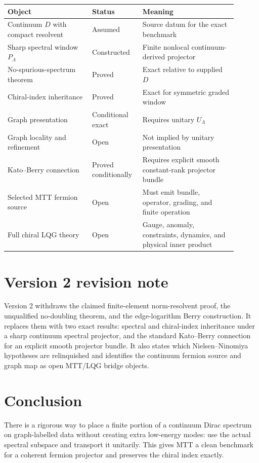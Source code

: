 \documentclass[11pt]{article}
\begin{document}
\begin{center}
\begin{tabular}{p{0.34\linewidth}p{0.18\linewidth}p{0.38\linewidth}}
\hline
Object & Status & Meaning\\
\hline
Continuum \(D\) with compact resolvent & Assumed & Source datum for the exact
benchmark\\
Sharp spectral window \(P_\Lambda\) & Constructed & Finite nonlocal
continuum-derived projector\\
No-spurious-spectrum theorem & Proved & Exact relative to supplied \(D\)\\
Chiral-index inheritance & Proved & Exact for symmetric graded window\\
Graph presentation & Conditional exact & Requires unitary
\(U_\Lambda\)\\
Graph locality and refinement & Open & Not implied by unitary presentation\\
Kato--Berry connection & Proved conditionally & Requires explicit smooth
constant-rank projector bundle\\
Selected MTT fermion source & Open & Must emit bundle, operator, grading, and
finite operation\\
Full chiral LQG theory & Open & Gauge, anomaly, constraints, dynamics, and
physical inner product\\
\hline
\end{tabular}
\end{center}

\section{Version 2 revision note}

Version 2 withdraws the claimed finite-element norm-resolvent proof, the
unqualified no-doubling theorem, and the edge-logarithm Berry construction.
It replaces them with two exact results: spectral and chiral-index
inheritance under a sharp continuum spectral projector, and the standard
Kato--Berry connection for an explicit smooth projector bundle. It also
states which Nielsen--Ninomiya hypotheses are relinquished and identifies the
continuum fermion source and graph map as open MTT/LQG bridge objects.

\section{Conclusion}

There is a rigorous way to place a finite portion of a continuum Dirac
spectrum on graph-labelled data without creating extra low-energy modes:
use the actual spectral subspace and transport it unitarily. This gives MTT a
clean benchmark for a coherent fermion projector and preserves the chiral
index exactly.
\end{document}
